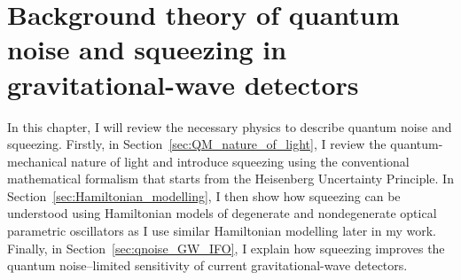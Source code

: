 \chapter{Background theory of quantum noise and squeezing in gravitational-wave detectors} %
\label{chp:background_theory}





In this chapter, I will review the necessary physics to describe quantum noise and squeezing. Firstly, in Section~\ref{sec:QM_nature_of_light}, I review the quantum-mechanical nature of light and introduce squeezing using the conventional mathematical formalism that starts from the Heisenberg Uncertainty Principle. In Section~\ref{sec:Hamiltonian_modelling}, I then show how squeezing can be understood using Hamiltonian models of degenerate and nondegenerate optical parametric oscillators as I use similar Hamiltonian modelling later in my work. %
Finally, in Section~\ref{sec:qnoise_GW_IFO}, I explain how squeezing improves the quantum noise--limited sensitivity of current gravitational-wave detectors.


